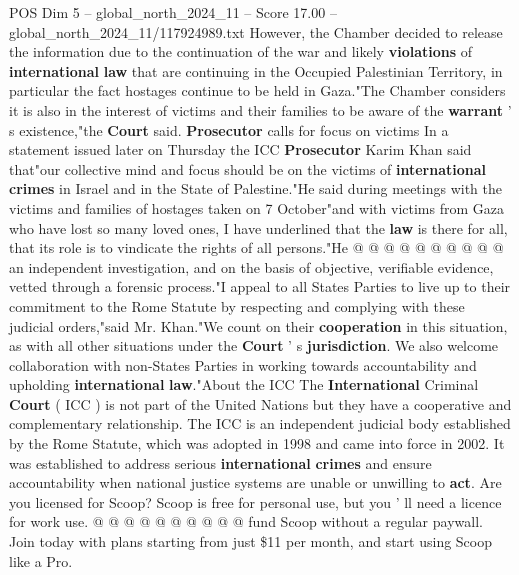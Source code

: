 \begin{textsample}{POS Dim 5 – global\_north\_2024\_11 – Score 17.00 – global\_north\_2024\_11/117924989.txt}
However, the Chamber decided to release the information due to the continuation of the war and likely \textbf{violations} of \textbf{international} \textbf{law} that are continuing in the Occupied Palestinian Territory, in particular the fact hostages continue to be held in Gaza."The Chamber considers it is also in the interest of victims and their families to be aware of the \textbf{warrant} ' s existence,"the \textbf{Court} said. \textbf{Prosecutor} calls for focus on victims In a statement issued later on Thursday the ICC \textbf{Prosecutor} Karim Khan said that"our collective mind and focus should be on the victims of \textbf{international} \textbf{crimes} in Israel and in the State of Palestine."He said during meetings with the victims and families of hostages taken on 7 October"and with victims from Gaza who have lost so many loved ones, I have underlined that the \textbf{law} is there for all, that its role is to vindicate the rights of all persons."He @ @ @ @ @ @ @ @ @ @ an independent investigation, and on the basis of objective, verifiable evidence, vetted through a forensic process."I appeal to all States Parties to live up to their commitment to the Rome Statute by respecting and complying with these judicial orders,"said Mr.
Khan."We count on their \textbf{cooperation} in this situation, as with all other situations under the \textbf{Court} ' s \textbf{jurisdiction}.
We also welcome collaboration with non-States Parties in working towards accountability and upholding \textbf{international} \textbf{law}."About the ICC The \textbf{International} Criminal \textbf{Court} ( ICC ) is not part of the United Nations but they have a cooperative and complementary relationship.
The ICC is an independent judicial body established by the Rome Statute, which was adopted in 1998 and came into force in 2002.
It was established to address serious \textbf{international} \textbf{crimes} and ensure accountability when national justice systems are unable or unwilling to \textbf{act}.
Are you licensed for Scoop?
Scoop is free for personal use, but you ' ll need a licence for work use. @ @ @ @ @ @ @ @ @ @ fund Scoop without a regular paywall.
Join today with plans starting from just \$11 per month, and start using Scoop like a Pro.

\end{textsample}
